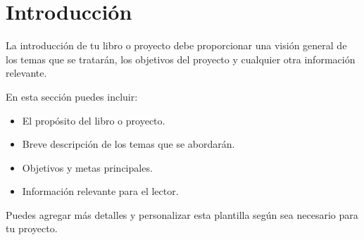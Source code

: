 \cleardoublepage
\chapter*{Introducción}


La introducción de tu libro o proyecto debe proporcionar una visión general de los temas que se tratarán, los objetivos del proyecto y cualquier otra información relevante. 

En esta sección puedes incluir:

\begin{itemize}
    \item El propósito del libro o proyecto.
    \item Breve descripción de los temas que se abordarán.
    \item Objetivos y metas principales.
    \item Información relevante para el lector.
\end{itemize}

Puedes agregar más detalles y personalizar esta plantilla según sea necesario para tu proyecto.
 